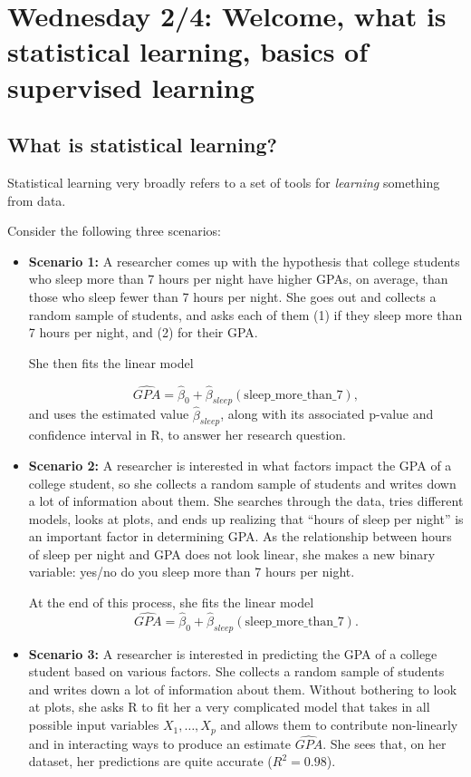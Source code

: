 \section{Wednesday 2/4: Welcome, what is statistical learning, basics of supervised learning}

\subsection{What is statistical learning?}
\label{sec_veryintro}

Statistical learning very broadly refers to a set of tools for \emph{learning} something from data. 

Consider the following three scenarios:
\begin{itemize}
\item \textbf{Scenario 1:} A researcher comes up with the hypothesis that college students who sleep more than 7 hours per night have higher GPAs, on average, than those who sleep fewer than 7 hours per night. She goes out and collects a random sample of students, and asks each of them (1) if they sleep more than 7 hours per night, and (2) for their GPA.

She then fits the linear model

$$
\widehat{GPA} = \hat{\beta}_0 + \hat{\beta}_{sleep} (\mathrm{sleep\_more\_than\_7}),
$$
and uses the estimated value $\hat{\beta}_{sleep}$, along with its associated p-value and confidence interval in R, to answer her research question.
\item \textbf{Scenario 2:} A researcher is interested in what factors impact the GPA of a college student, so she collects a random sample of students and writes down a lot of information about them. She searches through the data, tries different models, looks at plots, and ends up realizing that “hours of sleep per night” is an important factor in determining GPA. As the relationship between hours of sleep per night and GPA does not look linear, she makes a new binary variable: yes/no do you sleep more than 7 hours per night.

At the end of this process, she fits the linear model
$$
\widehat{GPA} = \hat{\beta}_0 + \hat{\beta}_{sleep} (\mathrm{sleep\_more\_than\_7}).
$$
\item \textbf{Scenario 3: } A researcher is interested in predicting the GPA of a college student based on various factors. She collects a random sample of students and writes down a lot of information about them. Without bothering to look at plots, she asks R to fit her a very complicated model that takes in all possible input variables $X_1,\ldots,X_p$ and allows them to contribute non-linearly and in interacting ways to produce an estimate $\widehat{GPA}$. She sees that, on her dataset, her predictions are quite accurate ($R^2=0.98$). 
\end{itemize}

